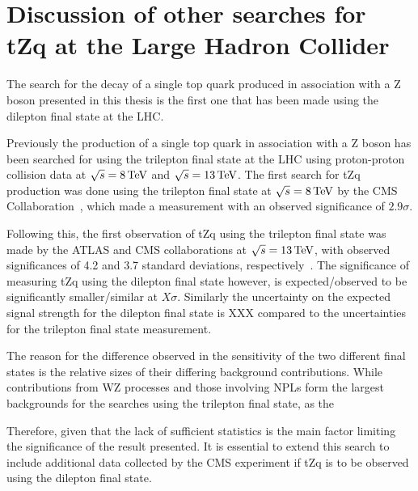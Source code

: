 \section{Discussion of other searches for tZq at the Large Hadron Collider}
The search for the decay of a single top quark produced in association with a Z boson presented in this thesis is the first one that has been made using the dilepton final state at the LHC.

Previously the production of a single top quark in association with a Z boson has been searched for using the trilepton final state at the LHC using proton-proton collision data at $\sqrt{s} = 8 \,\text{Te\hspace{-.08em}V}$ and $\sqrt{s} = 13 \,\text{Te\hspace{-.08em}V}$.
The first search for tZq production was done using the trilepton final state at $\sqrt{s} = 8 \,\text{Te\hspace{-.08em}V}$ by the CMS Collaboration~\cite{Sirunyan:2017kkr}, which made a measurement with an observed significance of $2.9 \sigma$.

Following this, the first observation of tZq using the trilepton final state was made by the ATLAS and CMS collaborations at $\sqrt{s} = 13 \,\text{Te\hspace{-.08em}V}$, with observed significances of 4.2 and 3.7 standard deviations, respectively~\cite{Aaboud:2017ylb,Sirunyan:2017nbr}.
The significance of measuring tZq using the dilepton final state however, is expected/observed to be significantly smaller/similar at $X \sigma$.
Similarly the uncertainty on the expected signal strength for the dilepton final state is XXX compared to the uncertainties for the trilepton final state measurement.

The reason for the difference observed in the sensitivity of the two different final states is the relative sizes of their differing background contributions.
While contributions from WZ processes and those involving NPLs form the largest backgrounds for the searches using the trilepton final state, as the 


Therefore, given that the lack of sufficient statistics is the main factor limiting the significance of the result presented.
It is essential to extend this search to include additional data collected by the CMS experiment if tZq is to be observed using the dilepton final state.
